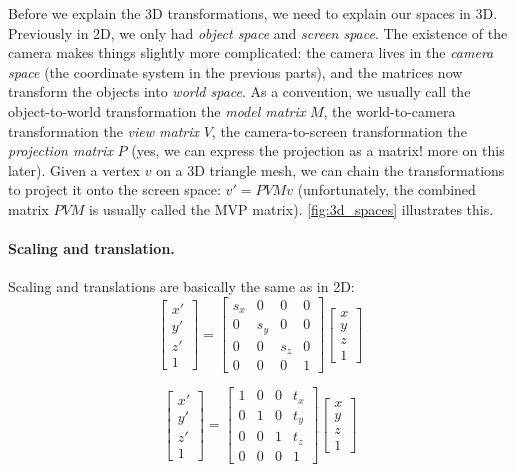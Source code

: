Before we explain the 3D transformations, we need to explain our spaces in 3D. Previously in 2D, we only had \emph{object space} and \emph{screen space}. The existence of the camera makes things slightly more complicated: the camera lives in the \emph{camera space} (the coordinate system in the previous parts), and the matrices now transform the objects into \emph{world space}. As a convention, we usually call the object-to-world transformation the \emph{model matrix} $M$, the world-to-camera transformation the \emph{view matrix} $V$, the camera-to-screen transformation the \emph{projection matrix} $P$ (yes, we can express the projection as a matrix! more on this later). Given a vertex $v$ on a 3D triangle mesh, we can chain the transformations to project it onto the screen space: $v'=PVMv$ (unfortunately, the combined matrix $PVM$ is usually called the MVP matrix). \cref{fig:3d_spaces} illustrates this.

\paragraph{Scaling and translation.} Scaling and translations are basically the same as in 2D:
\begin{equation}
\begin{bmatrix}
x' \\
y' \\
z' \\
1
\end{bmatrix}
=
\begin{bmatrix}
s_x & 0 & 0 & 0 \\
0 & s_y & 0 & 0 \\
0 & 0 & s_z & 0 \\
0 & 0 & 0 & 1
\end{bmatrix}
\begin{bmatrix}
x \\
y \\
z \\
1
\end{bmatrix}
\end{equation}

\begin{equation}
\begin{bmatrix}
x' \\
y' \\
z' \\
1
\end{bmatrix}
=
\begin{bmatrix}
1 & 0 & 0 & t_x \\
0 & 1 & 0 & t_y \\
0 & 0 & 1 & t_z \\
0 & 0 & 0 & 1
\end{bmatrix}
\begin{bmatrix}
x \\
y \\
z \\
1
\end{bmatrix}
\end{equation}

